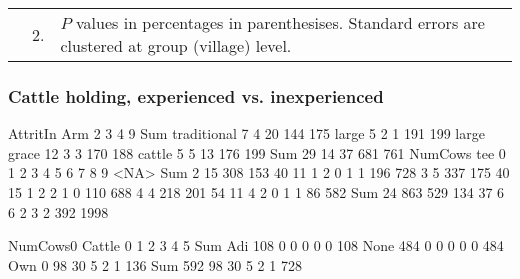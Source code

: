 \begin{minipage}[t]{14cm}
\begin{tabular}{>{\hfill\scriptsize}p{1cm}<{}>{\hfill\scriptsize}p{.25cm}<{}>{\scriptsize}p{12cm}<{\hfill}}
& 2. & $P$ values in percentages in parenthesises. Standard errors are clustered at group (village) level.
\end{tabular}
\end{minipage}


\subsubsection{Cattle holding, experienced vs. inexperienced}


\begin{Schunk}
\begin{Soutput}
             AttritIn
Arm             2   3   4   9 Sum
  traditional   7   4  20 144 175
  large         5   2   1 191 199
  large grace  12   3   3 170 188
  cattle        5   5  13 176 199
  Sum          29  14  37 681 761
     NumCows
tee      0    1    2    3    4    5    6    7    8    9 <NA>  Sum
  2     15  308  153   40   11    1    2    0    1    1  196  728
  3      5  337  175   40   15    1    2    2    1    0  110  688
  4      4  218  201   54   11    4    2    0    1    1   86  582
  Sum   24  863  529  134   37    6    6    2    3    2  392 1998
\end{Soutput}
\end{Schunk}
\begin{Schunk}
\begin{Soutput}
      NumCows0
Cattle   0   1   2   3   4   5 Sum
  Adi  108   0   0   0   0   0 108
  None 484   0   0   0   0   0 484
  Own    0  98  30   5   2   1 136
  Sum  592  98  30   5   2   1 728
\end{Soutput}
\end{Schunk}




